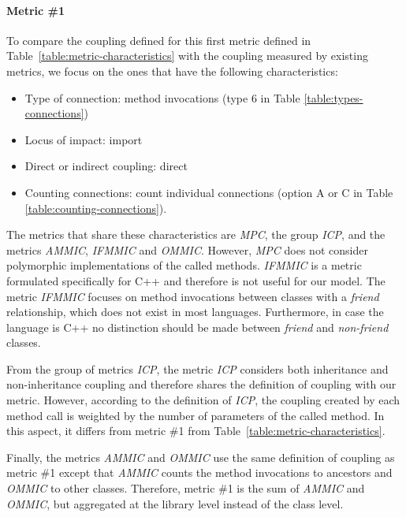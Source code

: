 \paragraph{Metric \#1}
To compare the coupling defined for this first metric defined in Table~\ref{table:metric-characteristics} with the coupling measured by existing metrics, we focus on the ones that have the following characteristics:

\begin{itemize}
  \item Type of connection: method invocations (type 6 in Table \ref{table:types-connections})
  \item Locus of impact: import
  \item Direct or indirect coupling: direct
  \item Counting connections: count individual connections (option A or C in Table \ref{table:counting-connections}).
\end{itemize}

The metrics that share these characteristics are \textit{MPC}, the group \textit{ICP}, and the metrics \textit{AMMIC}, \textit{IFMMIC} and \textit{OMMIC}. However, \textit{MPC} does not consider polymorphic implementations of the called methods. \textit{IFMMIC} is a metric formulated specifically for C++ \cite{briand1997investigation} and therefore is not useful for our model. The metric \textit{IFMMIC} focuses on method invocations between classes with a \textit{friend} relationship, which does not exist in most languages. Furthermore, in case the language is C++ no distinction should be made between \textit{friend} and \textit{non-friend} classes.

From the group of metrics \textit{ICP}, the metric \textit{ICP}  considers both inheritance and non-inheritance coupling and therefore shares the definition of coupling with our metric. However, according to the definition of \textit{ICP}, the coupling created by each method call is weighted by the number of parameters of the called method. In this aspect, it differs from metric \#1 from Table~\ref{table:metric-characteristics}.

Finally, the metrics \textit{AMMIC} and \textit{OMMIC} use the same definition of coupling as metric \#1 except that \textit{AMMIC} counts the method invocations to ancestors and \textit{OMMIC} to other classes. Therefore, metric \#1 is the sum of \textit{AMMIC} and \textit{OMMIC}, but aggregated at the library level instead of the class level.

